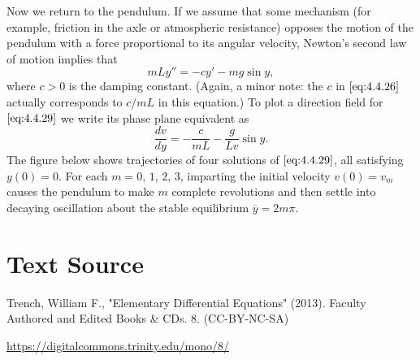 \documentclass{ximera}
\begin{document}
 
\begin{example}\label{example:4.4.5}
Now we
return to the pendulum. If we assume that
some mechanism (for example, friction in the axle or atmospheric
resistance) opposes the motion of the pendulum with a force
proportional to its angular velocity,  Newton's second law of
motion implies that
\begin{equation}\label{eq:4.4.29}
mLy''=-cy'-mg\sin y,
\end{equation}
where $c>0$ is the damping constant. (Again, a minor note: the $c$
in $\eqref{eq:4.4.26}$ actually corresponds to $c/mL$ in this equation.)
To plot a direction field for $\eqref{eq:4.4.29}$ we write its phase plane
equivalent as
$$
\frac{dv}{dy}=-\frac{c}{mL}-\frac{g}{Lv} \sin y.
$$
The figure below shows
trajectories of four solutions of $\eqref{eq:4.4.29}$, all satisfying
$y(0)=0$. For each $m=0$, $1$, $2$, $3$, imparting the initial velocity
$v(0)=v_m$ causes the pendulum to make $m$ complete revolutions and
then settle into decaying oscillation about the stable equilibrium
$\overline{y}=2m\pi$.

\begin{center}
\end{center}
 
 
 
\end{example}
 
 
 
 
 
 
\section*{Text Source}
Trench, William F., "Elementary Differential Equations" (2013). Faculty Authored and Edited Books \& CDs. 8. (CC-BY-NC-SA)
 
\href{https://digitalcommons.trinity.edu/mono/8/}{https://digitalcommons.trinity.edu/mono/8/}
 
 
\end{document}
